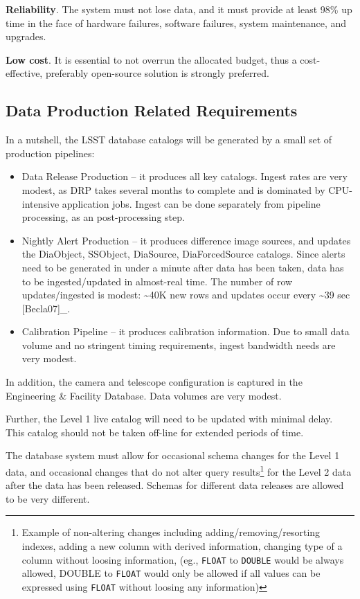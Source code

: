 \documentclass[DM,lsstdraft,toc]{lsstdoc}
\begin{document}
\textbf{Reliability}. The system must not lose data, and it must provide
at least 98\% up time in the face of hardware failures, software
failures, system maintenance, and upgrades.

\textbf{Low cost}. It is essential to not overrun the allocated budget,
thus a cost-effective, preferably open-source solution is strongly
preferred.

\subsection{Data Production Related
Requirements}\label{data-production-related-requirements}

In a nutshell, the LSST database catalogs will be generated by a small
set of production pipelines:

\begin{itemize}
\item
  Data Release Production -- it produces all key catalogs. Ingest rates
  are very modest, as DRP takes several months to complete and is
  dominated by CPU-intensive application jobs. Ingest can be done
  separately from pipeline processing, as an post-processing step.
\item
  Nightly Alert Production -- it produces difference image sources, and
  updates the DiaObject, SSObject, DiaSource, DiaForcedSource catalogs.
  Since alerts need to be generated in under a minute after data has
  been taken, data has to be ingested/updated in almost-real time. The
  number of row updates/ingested is modest: \textasciitilde{}40K new
  rows and updates occur every \textasciitilde{}39 sec {[}Becla07{]}\_.
\item
  Calibration Pipeline -- it produces calibration information. Due to
  small data volume and no stringent timing requirements, ingest
  bandwidth needs are very modest.
\end{itemize}

In addition, the camera and telescope configuration is captured in the
Engineering \& Facility Database. Data volumes are very modest.

Further, the Level 1 live catalog will need to be updated with minimal
delay. This catalog should not be taken off-line for extended periods of
time.

The database system must allow for occasional schema changes for the
Level 1 data, and occasional changes that do not alter query
results\footnote{Example of non-altering changes including
  adding/removing/resorting indexes, adding a new column with derived
  information, changing type of a column without loosing information,
  (eg., \texttt{FLOAT} to \texttt{DOUBLE} would be always allowed,
  DOUBLE to \texttt{FLOAT} would only be allowed if all values can be
  expressed using \texttt{FLOAT} without loosing any information)} for
the Level 2 data after the data has been released. Schemas for different
data releases are allowed to be very different.
\end{document}
